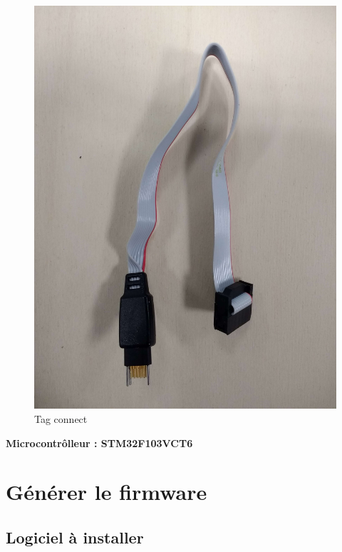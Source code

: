 \documentclass{article}
\begin{document}
\begin{figure}[H]
\begin{center}
\advance\leftskip-3cm
\advance\rightskip-3cm
\includegraphics[keepaspectratio=true,scale=0.05]{tag_connect.jpg}
\caption{Tag connect}
\label{visina8}
\end{center}\end{figure}


\textbf{Microcontrôlleur : STM32F103VCT6}



\section{Générer le firmware}

\subsection{Logiciel à installer}
\end{document}
